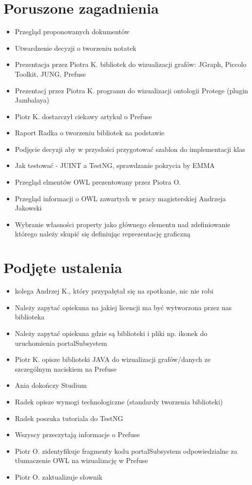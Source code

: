 \documentclass[a4paper,10pt]{article}
\begin{document}
\section{Poruszone zagadnienia}
\begin{itemize}
 	\item Przegląd proponowanych dokumentów
	\item Utwardzenie decyzji o tworzeniu notatek
	\item Prezentacja przez Piotra K. bibliotek do wizualizacji grafów: JGraph, Piccolo Toolkit, JUNG, Prefuse
	\item Prezentacj przez Piotra K. programu do wizualizacji ontologii Protege (plugin Jambalaya) 
	\item Piotr K. dostarczył ciekawy artykul o Prefuse \cite{art}
	\item Raport Radka o tworzeniu bibliotek na podstawie  \cite{pdfik}
	\item Podjęcie decyzji aby w przysłości przygotować szablon do implementacji klas
	\item Jak testować - JUINT a TestNG, \cite{linczek}  sprawdzanie pokrycia by EMMA \cite{innylinczke}
	\item  Przegląd elmentów OWL prezentowany przez Piotra O. \cite{linkW3c}	
	\item Przegląd informacji o OWL zawartych w pracy magisterskiej Andrzeja Jakowski \cite{pracka}
	\item Wybranie własności property jako głównego elementu nad zdefiniowanie którego należy skupić się definiując reprezentację graficzną
	   
\end{itemize}


\section{Podjęte ustalenia}
\begin{itemize}
	\item kolega Andrzej K., który przypałętał się na spotkanie, nic nie robi
 	\item Należy zapytać opiekuna na jakiej licencji ma być wytworzona przez nas biblioteka 
	\item Należy zapytać opiekuna gdzie są biblioteki i pliki np. ikonek do uruchomienia portalSubsystem
	\item Piotr K. opisze biblioteki JAVA do wizualizacji grafów/danych ze szczególnym naciskiem na Prefuse
	\item Ania dokończy Studium
	\item Radek opisze wymogi technologiczne (standardy tworzenia biblioteki)
	\item Radek poszuka tutoriala do TestNG
	\item Wszyscy przeczytają informacje o Prefuse
	\item Piotr O. zidentyfikuje fragmenty kodu portalSubsystem odpowiedzialne za tłumaczenie OWL na wizualizację w Prefuse
	\item Piotr O. zaktualizuje słownik
\end{itemize}





\clearpage
{}
{}

\end{document}
